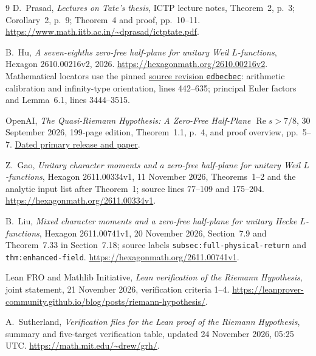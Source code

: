 \documentclass[11pt]{article}
\newcommand{\Rea}{\operatorname{Re}}
\theoremstyle{definition}
\theoremstyle{remark}
\begin{document}
\begin{thebibliography}{9}
D.~Prasad, \emph{Lectures on Tate's thesis}, ICTP lecture notes,
Theorem~2, p.~3; Corollary~2, p.~9; Theorem~4 and proof, pp.~10--11.
\url{https://www.math.iitb.ac.in/~dprasad/ictptate.pdf}.

B.~Hu, \emph{A seven-eighths zero-free half-plane for unitary Weil
$L$-functions}, Hexagon 2610.00216v2, 2026.
\url{https://hexagonmath.org/2610.00216v2}.
Mathematical locators use the pinned
\href{https://github.com/Rogerhu12/hecke-seven-eighths/blob/edbecbec14e1a2efd50d1f0606b475fa5eab88f8/weil_seven_eighths_revised.tex}{source revision \texttt{edbecbec}}:
arithmetic calibration and infinity-type orientation,
lines 442--635; principal Euler factors and Lemma~6.1,
lines 3444--3515.

OpenAI, \emph{The Quasi-Riemann Hypothesis: A Zero-Free Half-Plane
$\Rea s>7/8$}, 30 September 2026, 199-page edition,
Theorem~1.1, p.~4, and proof overview, pp.~5--7.
\href{https://github.com/openai/math/blob/main/preprints/The-Quasi-Riemann-Hypothesis-September-30-2026/paper.pdf}{Dated primary release and paper}.

Z.~Gao, \emph{Unitary character moments and a zero-free half-plane
for unitary Weil $L$-functions}, Hexagon 2611.00334v1,
11 November 2026, Theorems~1--2 and the analytic input list after
Theorem~1; source lines 77--109 and 175--204.
\url{https://hexagonmath.org/2611.00334v1}.

B.~Liu, \emph{Mixed character moments and a zero-free half-plane
for unitary Hecke $L$-functions}, Hexagon 2611.00741v1,
20 November 2026, Section~7.9 and Theorem~7.33 in Section~7.18;
source labels \texttt{subsec:full-physical-return} and
\texttt{thm:enhanced-field}.
\url{https://hexagonmath.org/2611.00741v1}.

Lean FRO and Mathlib Initiative, \emph{Lean verification of the Riemann
Hypothesis}, joint statement, 21 November 2026, verification criteria
1--4.
\url{https://leanprover-community.github.io/blog/posts/riemann-hypothesis/}.

A.~Sutherland, \emph{Verification files for the Lean proof of the Riemann
Hypothesis}, summary and five-target verification table, updated
24 November 2026, 05:25 UTC.
\url{https://math.mit.edu/~drew/grh/}.
\end{thebibliography}
\end{document}
